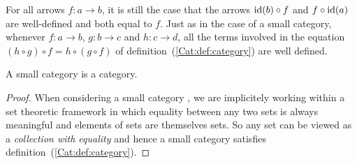 For all arrows $f:a\to b$, it is still
the case that the arrows $\mbox{\rm id}(b)\circ f$ and $f\circ\mbox{\rm id}(a)$ are well-defined
and both equal to $f$. Just as in the case of a small category, whenever 
$f:a\to b$, $g:b\to c$ and $h:c\to d$, all the terms involved in the 
equation $(h\circ g)\circ f=h\circ(g\circ f)$ of
definition~(\ref{Cat:def:category}) are well defined.


\begin{prop}\label{Cat:prop:smallcat:is:cat}
    A small category is a category.
\end{prop}
\begin{proof}
    When considering a small category \Cat, we are implicitely working
    within a set theoretic framework in which equality between any two
    sets is always meaningful and elements of sets are themselves sets.
    So any set can be viewed as a {\em collection with equality} and 
    hence a small category satisfies definition~(\ref{Cat:def:category}).
\end{proof}
